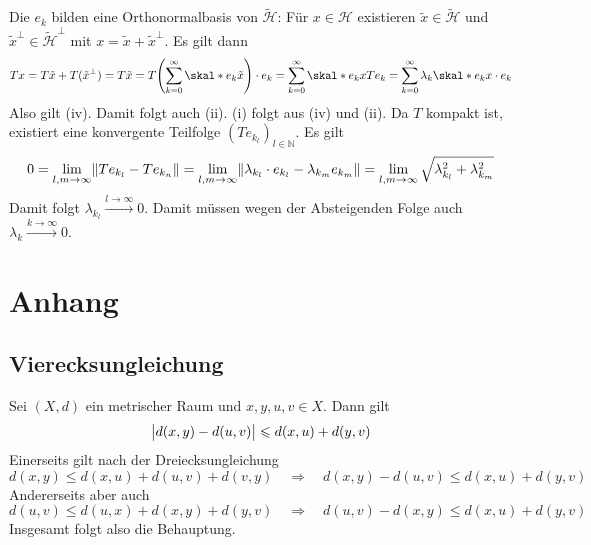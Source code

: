 Die $e_k$ bilden eine Orthonormalbasis von $\tilde{\mathcal{H}}$: Für $x \in \mathcal{H}$ existieren $\tilde{x} \in \tilde{\mathcal{H}}$ und $\tilde{x}^\bot \in \tilde{\mathcal{H}}^\bot$ mit $x= \tilde{x} + \tilde{x}^\bot$. Es gilt dann 
\[
	T x = T \tilde{x} + T(\tilde{x}^\bot) = T \tilde{x} = T \enbrace*{\sum_{k=0}^{\infty} \skal*{e_k}{\tilde{x}}} \cdot e_k = \sum_{k=0}^{\infty} \skal*{e_k}{x} T e_k
	= \sum_{k=0}^{\infty} \lambda_k \skal*{e_k}{x} \cdot e_k 
\]
Also gilt (iv). Damit folgt auch (ii). (i) folgt aus (iv) und (ii). Da $T$ kompakt ist, existiert eine konvergente Teilfolge $(T e_{k_l})_{l \in \mathds{N}}$. Es gilt
\[
	0=\lim_{l,m \to \infty} \norm{T e_{k_l} - T e_{k_n}} = \lim_{l,m \to \infty} \norm{\lambda_{k_l} \cdot e_{k_l} - \lambda_{k_m} e_{k_m}} = 
	\lim_{l,m \to \infty}  \sqrt{\lambda_{k_l}^2 + \lambda_{k_m}^2}  
\]
Damit folgt $\lambda_{k_l} \xrightarrow{l \to \infty} 0$. Damit müssen wegen der Absteigenden Folge auch $\lambda_k \xrightarrow{k \to \infty} 0$. \bewende

\cleardoubleoddemptypage
\appendix
\section{Anhang} %
\label{sec:anhang}

\subsection{Vierecksungleichung} %
\label{sub:vier_ungl}
Sei $(X,d)$ ein metrischer Raum und $x,y,u,v \in X$. Dann gilt
\[
	\abs[\big]{d(x,y) - d(u,v)} \le d(x,u) + d(y,v) 
\]
Einerseits gilt nach der Dreiecksungleichung
\[
	d(x,y) \le d(x,u) + d(u,v) + d(v,y) \quad \Longrightarrow \quad d(x,y) - d(u,v) \le d(x,u) + d(y,v)
\]
Andererseits aber auch
\[
	d(u,v) \le d(u,x) + d(x,y) + d(y,v) \quad \Longrightarrow \quad d(u,v) - d(x,y) \le d(x,u) + d(y,v)
\]
Insgesamt folgt also die Behauptung. \bewende

